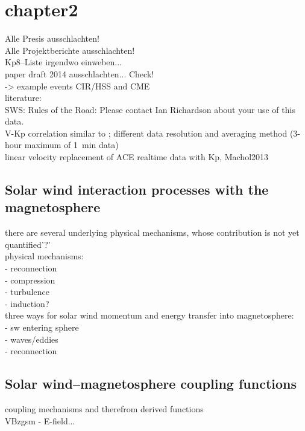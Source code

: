 \chapter{chapter2}


Alle Presis ausschlachten!\\
Alle Projektberichte ausschlachten!\\
Kp8--Liste irgendwo einweben...\\
paper draft 2014 ausschlachten... Check!\\


-> example events CIR/HSS and CME\\

literature:\\
SWS: Rules of the Road: Please contact Ian Richardson about your use of this data.\\
V-Kp correlation similar to \citet{Elliott2013}; different data resolution and averaging method (3-hour maximum of 1~min data)\\
linear velocity replacement of ACE realtime data with Kp, Machol2013\\


\section{Solar wind interaction processes with the magnetosphere}
there are several underlying physical mechanisms, whose contribution is not yet quantified'?'\\
physical mechanisms:\\
- reconnection\\
- compression\\
- turbulence\\
- induction?\\

three ways for solar wind momentum and energy transfer into magnetosphere:\\
- sw entering sphere\\
- waves/eddies\\
- reconnection\\


\section{Solar wind--magnetosphere coupling functions}
coupling mechanisms and therefrom derived functions\\
VBzgsm - E-field...\\

